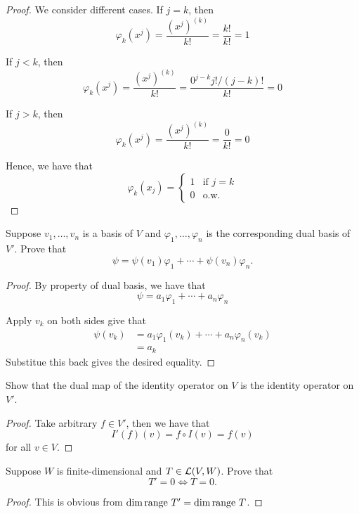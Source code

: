 \documentclass{extarticle}
\begin{document}
\begin{proof}
We consider different cases. If \(j = k\), then 
\[\varphi_k(x^j) = \frac{(x^j)^{(k)}}{k!} = \frac{k!}{k!} = 1\]

If \(j < k\), then 
\[\varphi_k(x^j) = \frac{(x^j)^{(k)}}{k!} = \frac{0^{j-k}   j!/(j-k)!}{k!} = 0\]

If \(j > k\), then 
\[\varphi_k(x^j) = \frac{(x^j)^{(k)}}{k!} = \frac{0}{k!} = 0\]

Hence, we have that 
\[\varphi_k(x_j) = \begin{cases}
    1 & \text{if } j=k \\ 
    0 & \text{o.w.}
\end{cases}\]
\end{proof}


\begin{problem}{11} 
    Suppose \(v_1, \ldots, v_n\) is a basis of \(V\) and \(\varphi_1, \ldots, \varphi_n\) is 
    the corresponding dual basis of \(V'\). Prove that 
    \[\psi = \psi(v_1) \varphi_1 + \cdots + \psi(v_n) \varphi_n .\]
\end{problem}

\begin{proof}
By property of dual basis, we have that 
\[\psi = a_1 \varphi_1 + \cdots + a_n \varphi_n\]

Apply \(v_k\) on both sides give that 
\begin{align*}
    \psi(v_k) 
    & = a_1 \varphi_1 (v_k) + \cdots + a_n \varphi_n (v_k) \\ 
    & = a_k
\end{align*}
Substitue this back gives the desired equality. 
\end{proof}


\begin{problem}{13}
    Show that the dual map of the identity operator on \(V\) is the identity operator on \(V'\). 
\end{problem}

\begin{proof}
Take arbitrary \(f \in V'\), then we have that 
\[I'(f)(v) = f \circ I(v) = f(v)\]
for all \(v \in V\). 
\end{proof}

\begin{problem}{16}
    Suppose \(W\) is finite-dimensional and \(T \in \mathcal{L}(V, W)\). Prove that 
    \[T' = 0 \Leftrightarrow T = 0.\]
\end{problem}

\begin{proof}
This is obvious from \(\dim \text{range } T' = \dim \text{range } T\). 
\end{proof}
\end{document}
